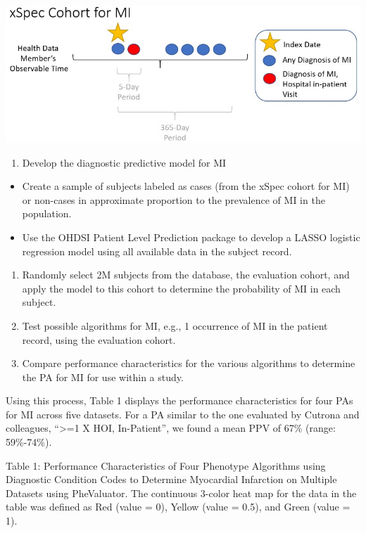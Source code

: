 \documentclass[11pt]{book}
\providecommand{\tightlist}{%
  \setlength{\itemsep}{0pt}\setlength{\parskip}{0pt}}
\theoremstyle{definition}
\theoremstyle{definition}
\theoremstyle{definition}
\theoremstyle{remark}
\begin{document}
\begin{center}\includegraphics[width=0.75\linewidth]{images/ClinicalValidity/figure5} \end{center}

\begin{enumerate}
\def\labelenumi{\arabic{enumi})}
\setcounter{enumi}{1}
\tightlist
\item
  Develop the diagnostic predictive model for MI
\end{enumerate}

\begin{itemize}
\item
  Create a sample of subjects labeled as cases (from the xSpec cohort for MI) or non-cases in approximate proportion to the prevalence of MI in the population.
\item
  Use the OHDSI Patient Level Prediction package to develop a LASSO logistic regression model using all available data in the subject record.
\end{itemize}

\begin{enumerate}
\def\labelenumi{\arabic{enumi})}
\setcounter{enumi}{2}
\item
  Randomly select 2M subjects from the database, the evaluation cohort, and apply the model to this cohort to determine the probability of MI in each subject.
\item
  Test possible algorithms for MI, e.g., 1 occurrence of MI in the patient record, using the evaluation cohort.
\item
  Compare performance characteristics for the various algorithms to determine the PA for MI for use within a study.
\end{enumerate}

Using this process, Table 1 displays the performance characteristics for four PAs for MI across five datasets. For a PA similar to the one evaluated by Cutrona and colleagues, ``\textgreater=1 X HOI, In-Patient'', we found a mean PPV of 67\% (range: 59\%-74\%).

Table 1: Performance Characteristics of Four Phenotype Algorithms using Diagnostic Condition Codes to Determine Myocardial Infarction on Multiple Datasets using PheValuator. The continuous 3-color heat map for the data in the table was defined as Red (value = 0), Yellow (value = 0.5), and Green (value = 1).
\end{document}
